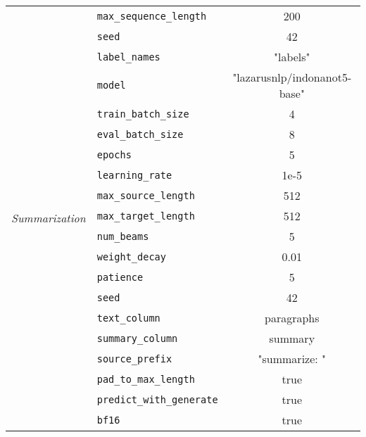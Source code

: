 \begin{table}[h]
{\begin{tabular}{|c|l|c|}
                                                         & \texttt{max\_sequence\_length} & 200 \\ \cline{2-3}
                                                         & \texttt{seed} & 42 \\ \cline{2-3}
                                                         & \texttt{label\_names} & "labels" \\ \hline
            \multirow{14}{*}{\textit{Summarization}} & \texttt{model} & "lazarusnlp/indonanot5-base" \\ \cline{2-3}
                                                    & \texttt{train\_batch\_size} & 4 \\ \cline{2-3}
                                                    & \texttt{eval\_batch\_size} & 8 \\ \cline{2-3}
                                                    & \texttt{epochs} & 5 \\ \cline{2-3}
                                                    & \texttt{learning\_rate} & 1e-5 \\ \cline{2-3}
                                                    & \texttt{max\_source\_length} & 512 \\ \cline{2-3}
                                                    & \texttt{max\_target\_length} & 512 \\ \cline{2-3}
                                                    & \texttt{num\_beams} & 5 \\ \cline{2-3}
                                                    & \texttt{weight\_decay} & 0.01 \\ \cline{2-3}
                                                    & \texttt{patience} & 5 \\ \cline{2-3}
                                                    & \texttt{seed} & 42 \\ \cline{2-3}
                                                    & \texttt{text\_column} & paragraphs \\ \cline{2-3}
                                                    & \texttt{summary\_column} & summary \\ \cline{2-3}
                                                    & \texttt{source\_prefix} & "summarize: " \\ \cline{2-3}
                                                    & \texttt{pad\_to\_max\_length} & true \\ \cline{2-3}
                                                    & \texttt{predict\_with\_generate} & true \\ \cline{2-3}
                                                    & \texttt{bf16} & true \\ \hline
        \end{tabular}
    }
\end{table}
